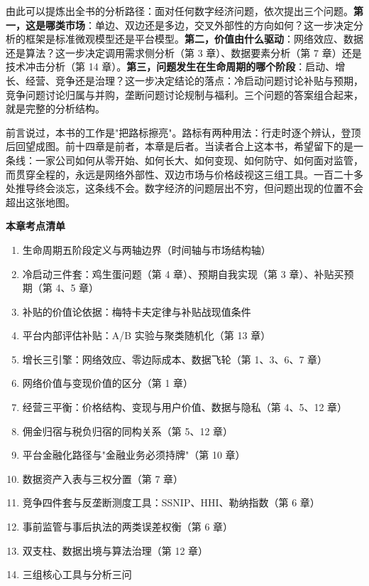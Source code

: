 由此可以提炼出全书的分析路径：面对任何数字经济问题，依次提出三个问题。\textbf{第一，这是哪类市场}：单边、双边还是多边，交叉外部性的方向如何？这一步决定分析的框架是标准微观模型还是平台模型。\textbf{第二，价值由什么驱动}：网络效应、数据还是算法？这一步决定调用需求侧分析（第 3 章）、数据要素分析（第 7 章）还是技术冲击分析（第 14 章）。\textbf{第三，问题发生在生命周期的哪个阶段}：启动、增长、经营、竞争还是治理？这一步决定结论的落点：冷启动问题讨论补贴与预期，竞争问题讨论归属与并购，垄断问题讨论规制与福利。三个问题的答案组合起来，就是完整的分析结构。

前言说过，本书的工作是"把路标擦亮"。路标有两种用法：行走时逐个辨认，登顶后回望成图。前十四章是前者，本章是后者。当读者合上这本书，希望留下的是一条线：一家公司如何从零开始、如何长大、如何变现、如何防守、如何面对监管，而贯穿全程的，永远是网络外部性、双边市场与价格歧视这三组工具。一百二十多处推导终会淡忘，这条线不会。数字经济的问题层出不穷，但问题出现的位置不会超出这张地图。

\begin{chapterbox}
\textbf{本章考点清单}

\begin{enumerate}
\item 生命周期五阶段定义与两轴边界（时间轴与市场结构轴）
\item 冷启动三件套：鸡生蛋问题（第 4 章）、预期自我实现（第 3 章）、补贴买预期（第 4、5 章）
\item 补贴的价值论依据：梅特卡夫定律与补贴战现值条件 
\item 平台内部评估补贴：A/B 实验与聚类随机化（第 13 章）
\item 增长三引擎：网络效应、零边际成本、数据飞轮（第 1、3、6、7 章）
\item 网络价值与变现价值的区分（第 1 章）
\item 经营三平衡：价格结构、变现与用户价值、数据与隐私（第 4、5、12 章）
\item 佣金归宿与税负归宿的同构关系（第 5、12 章）
\item 平台金融化路径与"金融业务必须持牌"（第 10 章）
\item 数据资产入表与三权分置（第 7 章）
\item 竞争四件套与反垄断测度工具：SSNIP、HHI、勒纳指数（第 6 章）
\item 事前监管与事后执法的两类误差权衡（第 6 章）
\item 双支柱、数据出境与算法治理（第 12 章）
\item 三组核心工具与分析三问 
\end{enumerate}
\end{chapterbox}

